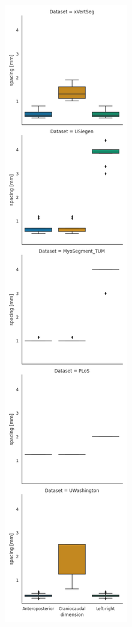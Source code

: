 \begin{figure}
\begin{minipage}{.4\textwidth}
    \end{minipage}%
    \begin{minipage}{0.4\textwidth}
        \includegraphics[width=.98\textwidth]{automated_graphs/AllDataset_SpacingBoxplot.png}

\end{minipage}
\end{figure}
